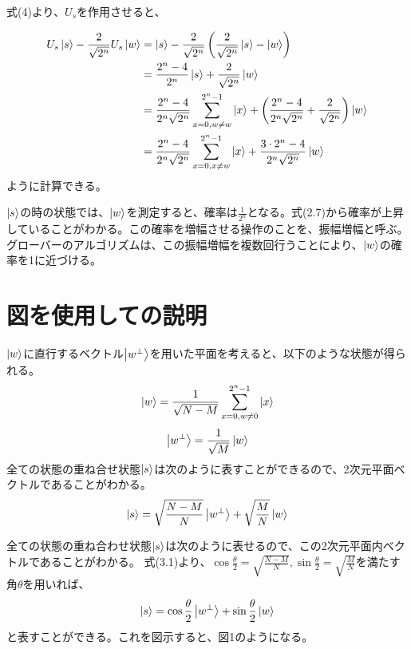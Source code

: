 \documentclass[platex,dvipdfmx]{jlreq}			%
\begin{document}
    式(4)より、$U_s$を作用させると、

    \begin{equation}
    \begin{split}
            U_s \ket{s} - \frac{2}{\sqrt{2^n}} U_s \ket{w} &= \ket{s} - \frac{2}{\sqrt{2^n}} \left( \frac{2}{\sqrt{2^n}} \ket{s} - \ket{w} \right) \\
        &= \frac{2^n - 4}{2^n} \ket{s} + \frac{2}{\sqrt{2^n}} \ket{w} \\
        &= \frac{2^n - 4}{2^n \sqrt{2^n}} \sum^{2^n - 1}_{x = 0, w \neq w} \ket{x} + \left( \frac{2^n - 4}{2^n \sqrt{2^n}} + \frac{2}{\sqrt{2^n}} \right) \ket{w} \\
        &= \frac{2^n - 4}{2^n \sqrt{2^n}} \sum^{2^n - 1}_{x = 0, x \neq w} \ket{x} + \frac{3 \cdot 2^n - 4}{2^n \sqrt{2^n}} \ket{w}
    \end{split}
    \end{equation}
    ように計算できる。

    $\ket{s}$の時の状態では、$\ket{w}$を測定すると、確率は$\frac{1}{2^n}$となる。式(2.7)から確率が上昇していることがわかる。この確率を増幅させる操作のことを、振幅増幅と呼ぶ。グローバーのアルゴリズムは、この振幅増幅を複数回行うことにより、$\ket{w}$の確率を1に近づける。


    \section{図を使用しての説明}
$\ket{w}$に直行するベクトル$\ket{w^{\perp}}$を用いた平面を考えると、以下のような状態が得られる。
$$
    \ket{w} = \frac{1}{\sqrt{N - M}} \sum^{2^n - 1}_{x = 0, w \neq 0} \ket{x}
$$
$$
    \ket{w^{\perp}} = \frac{1}{\sqrt{M}} \ket{w}
$$
全ての状態の重ね合せ状態$\ket{s}$は次のように表すことができるので、2次元平面ベクトルであることがわかる。
\begin{equation}
    \ket{s} = \sqrt{\frac{N - M}{N}}\ket{w^{\perp}} + \sqrt{\frac{M}{N}}\ket{w}
\end{equation}

全ての状態の重ね合わせ状態$\ket{s}$は次のように表せるので、この2次元平面内ベクトルであることがわかる。
式(3.1)より、$\cos{\frac{\theta}{2}} = \sqrt{\frac{N - M}{N}}, \sin{\frac{\theta}{2}} = \sqrt{\frac{M}{N}}$を満たす角$\theta$を用いれば、
\begin{equation}
    \ket{s} = \cos{\frac{\theta}{2}}\ket{w^{\perp}} + \sin{\frac{\theta}{2}}\ket{w}
\end{equation}
と表すことができる。これを図示すると、図1のようになる。
\end{document}
